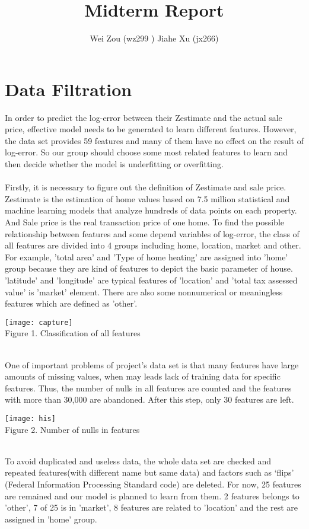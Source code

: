 \documentclass[12pt]{article}
\begin{document}
\title{Midterm Report}
\author{Wei Zou (wz299 )  Jiahe Xu (jx266)}
\maketitle

\section{Data Filtration}
In order to predict the log-error between their Zestimate and the actual sale price, effective model needs to be generated to learn different features. However, the data set provides 59 features and many of them have no effect on the result of log-error. So our group should choose some most related features to learn and then decide whether the model is underfitting or overfitting.\\
\\
Firstly, it is necessary to figure out the definition of Zestimate and sale price. Zestimate is the estimation of home values based on 7.5 million statistical and machine learning models that analyze hundreds of data points on each property. And Sale price is the real transaction price of one home. To find the possible relationship between features and some depend variables of log-error, the class of all features are divided into 4 groups including home, location, market and other. For example, 'total area' and 'Type of home heating' are assigned into 'home' group because they are kind of features to depict the basic parameter of house. 'latitude' and 'longitude' are typical features of 'location' and 'total tax assessed value' is 'market' element. There are also some nonnumerical or meaningless features which are defined as 'other'. \\

\begin{center}
\texttt{[image: capture]}\\
Figure 1. Classification of all features
\end{center}\\One of important problems of project's data set is that many features have large amounts of missing values, when may leads lack of training data for specific features. Thus, the number of nulls in all features are counted and the features with more than 30,000 are abandoned. After this step, only 30 features are left.

\begin{center}
\texttt{[image: his]}\\
Figure 2. Number of nulls in features
\end{center}\\To avoid duplicated and useless data, the whole data set are checked and repeated features(with different name but same data) and factors such as ‘flips’ (Federal Information Processing Standard code) are deleted. For now, 25 features are remained and our model is planned to learn from them.  2 features belongs to 'other', 7 of 25 is in 'market', 8 features are related to 'location' and the rest are assigned in 'home' group.
\end{document}
